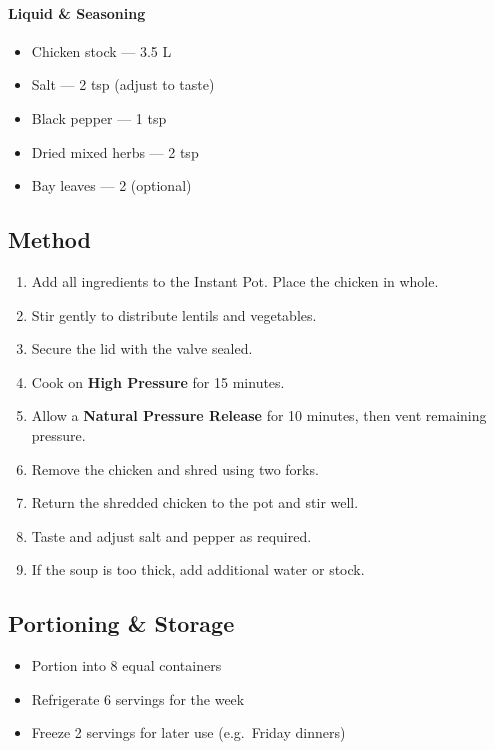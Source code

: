 \documentclass[11pt,a4paper]{article}
\begin{document}
\paragraph{Liquid \& Seasoning}
\begin{itemize}
    \item Chicken stock — 3.5 L
    \item Salt — 2 tsp (adjust to taste)
    \item Black pepper — 1 tsp
    \item Dried mixed herbs — 2 tsp
    \item Bay leaves — 2 (optional)
\end{itemize}

\vspace{0.5em}

\subsection*{Method}
\begin{enumerate}
    \item Add all ingredients to the Instant Pot. Place the chicken in whole.
    \item Stir gently to distribute lentils and vegetables.
    \item Secure the lid with the valve sealed.
    \item Cook on \textbf{High Pressure} for 15 minutes.
    \item Allow a \textbf{Natural Pressure Release} for 10 minutes, then vent remaining pressure.
    \item Remove the chicken and shred using two forks.
    \item Return the shredded chicken to the pot and stir well.
    \item Taste and adjust salt and pepper as required.
    \item If the soup is too thick, add additional water or stock.
\end{enumerate}

\vspace{0.5em}

\subsection*{Portioning \& Storage}
\begin{itemize}
    \item Portion into 8 equal containers
    \item Refrigerate 6 servings for the week
    \item Freeze 2 servings for later use (e.g.\ Friday dinners)
\end{itemize}
\end{document}

